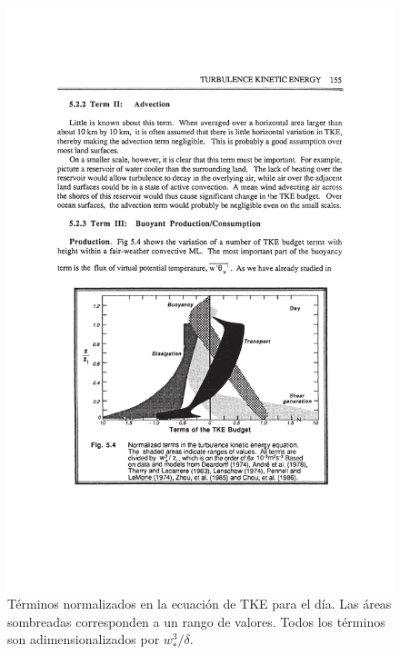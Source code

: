 \begin{figure}[h!]
	\centering
	\includegraphics[width=0.8\linewidth,trim={3cm 6.3cm 2.9cm 11.5cm},clip]{Imagenes/03/tke1}
	\caption{Términos normalizados en la ecuación de TKE para el día. Las áreas sombreadas corresponden a un rango de valores. Todos los términos son adimensionalizados por $w_*^3/\delta$.}
	\label{fig:03_tke1}
\end{figure}

